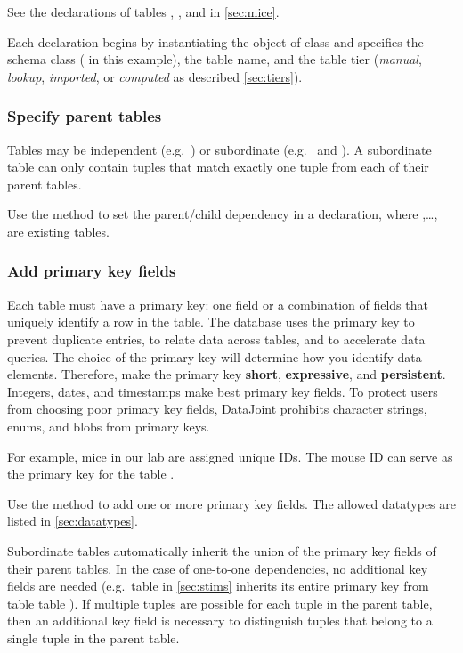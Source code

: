 \documentclass[10pt]{article}
\begin{document}
See the declarations of tables , , and  in \autoref{sec:mice}.

Each declaration begins by instantiating the object  of class  and specifies the schema class ( in this example), the table name, and the table tier ({\em manual}, {\em lookup}, {\em imported}, or {\em computed} as described \autoref{sec:tiers}). 

\subsubsection{Specify parent tables}\label{sec:addParent}
Tables may be independent (e.g.~) or subordinate (e.g.~ and ). A subordinate table can only contain tuples that match exactly one tuple from each of their parent tables. 

Use the  method to set the parent/child dependency in a declaration, where ,\ldots, are existing tables.

\subsubsection{Add primary key fields}  Each table must have a primary key: one field or a combination of fields that uniquely identify a row in the table.  The database uses the primary key to prevent duplicate entries, to relate data across tables, and to accelerate data queries. The choice of the primary key will determine how you identify data elements. Therefore, make the primary key {\bf short}, {\bf expressive}, and {\bf persistent}. Integers, dates, and timestamps make best primary key fields. To protect users from choosing poor primary key fields, DataJoint prohibits character strings, enums, and blobs from primary keys.

For example, mice in our lab are assigned unique IDs. The mouse ID can serve as the primary key for the table . 

Use the  method to add one or more primary key fields.  The allowed datatypes are listed in \autoref{sec:datatypes}.  


Subordinate tables automatically inherit the union of the primary key fields of their parent tables.  In the case of one-to-one dependencies, no additional key fields are needed (e.g.~table  in \autoref{sec:stims} inherits its entire primary key from table table ). If multiple tuples are possible for each tuple in the parent table, then an additional key field is necessary to distinguish tuples that belong to a single tuple in the parent table.
\end{document}
